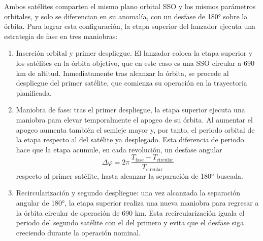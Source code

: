 Ambos satélites comparten el mismo plano orbital SSO y los mismos parámetros orbitales, y solo se diferencian en su anomalía, con un desfase de 180° sobre la órbita. Para lograr esta configuración, la etapa superior del lanzador ejecuta una estrategia de fase en tres maniobras:
\begin{enumerate}
    \item Inserción orbital y primer despliegue. El lanzador coloca la etapa superior y los satélites en la órbita objetivo, que en este caso es una SSO circular a 690 km de altitud. Inmediatamente tras alcanzar la órbita, se procede al despliegue del primer satélite, que comienza su operación en la trayectoria planificada.

    \item Maniobra de fase: tras el primer despliegue, la etapa superior ejecuta una maniobra para elevar temporalmente el apogeo de su órbita. Al aumentar el apogeo aumenta también el semieje mayor y, por tanto, el periodo orbital de la etapa respecto al del satélite ya desplegado. Esta diferencia de periodo hace que la etapa acumule, en cada revolución, un desfase angular
    \begin{equation}
        \Delta\varphi = 2\pi\,\frac{T_{\text{fase}} - T_{\text{circular}}}{T_{\text{circular}}}
    \end{equation}
    respecto al primer satélite, hasta alcanzar la separación de 180° buscada.

    \item Recircularización y segundo despliegue: una vez alcanzada la separación angular de 180°, la etapa superior realiza una nueva maniobra para regresar a la órbita circular de operación de 690 km. Esta recircularización iguala el periodo del segundo satélite con el del primero y evita que el desfase siga creciendo durante la operación nominal.
\end{enumerate}

